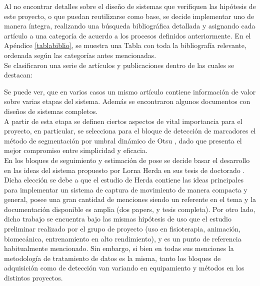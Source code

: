 Al no encontrar detalles sobre el diseño de sistemas que verifiquen las hipótesis de este proyecto, o que puedan reutilizarse como base, se decide implementar uno de manera íntegra, realizando una búsqueda bibliográfica detallada y asignando cada artículo a una categoría de acuerdo a los procesos definidos anteriormente. En el Apéndice \ref{tablabiblio}, se muestra una Tabla con toda la bibliografía relevante, ordenada según las categorías antes mencionadas.
\\ 

Se clasificaron una serie de artículos y publicaciones dentro de las cuales se destacan:


Se puede ver, que en varios casos un mismo artículo contiene información de valor sobre varias etapas del sistema. Además se encontraron algunos documentos con diseños de sistemas completos.
\\ 

A partir de esta etapa se definen ciertos aspectos de vital importancia para el proyecto, en particular, se selecciona para el bloque de detección de marcadores el método de segmentación por umbral dinámico de Otsu \cite{otsu}, dado que presenta el mejor compromiso entre simplicidad y eficacia.
\\ 

En los bloques de seguimiento y estimación de pose se decide basar el desarrollo en las ideas del sistema propuesto por Lorna Herda en sus tesis de doctorado \cite{herda}. Dicha elección se debe a que el estudio de Herda contiene las ideas principales para implementar un sistema de captura de movimiento de manera compacta y general, posee una gran cantidad de menciones siendo un referente en el tema y la documentación disponible es amplia (dos papers, y tesis completa). Por otro lado, dicho trabajo se encuentra bajo las mismas hipótesis de uso que el estudio preliminar realizado por el grupo de proyecto (uso en fisioterapia, animación, biomecánica, entrenamiento en alto rendimiento), y es un punto de referencia habitualmente mencionado. Sin embargo, si bien en todas sus menciones la metodología de tratamiento de datos es la misma, tanto los bloques de adquisición como de detección van variando en equipamiento y métodos en los distintos proyectos.